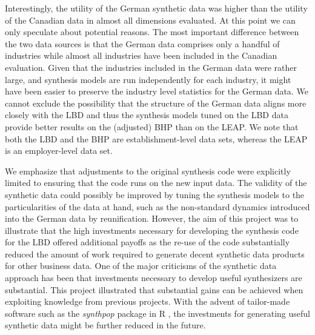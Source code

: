 \documentclass[10pt,twoside]{article}
\begin{document}
Interestingly, the utility of the German synthetic data was higher than the utility of the Canadian data in almost all dimensions evaluated. At this point we can only speculate about potential reasons. The most important difference between the two data sources is that the German data comprises only a handful of industries while almost all industries have been included in the Canadian evaluation. Given that the industries included in the German data were rather large, and synthesis models are run independently for each industry, it might have been easier to preserve the industry level statistics for the German data. We cannot exclude the possibility that  the structure of the German data aligns more closely with the LBD and thus the synthesis models tuned on the LBD data provide better results on the (adjusted) BHP than on the LEAP. We note that both the LBD and the BHP are establishment-level data sets, whereas the LEAP is an employer-level data set. 

We emphasize that adjustments to the original synthesis code were explicitly limited to ensuring that the code runs on the new input data. The validity of the synthetic data could possibly be improved by tuning the synthesis models to the particularities of the data at hand, such as the non-standard dynamics introduced into the German data by reunification.  However, the aim of this project was to illustrate that the high investments necessary for developing the synthesis code for the LBD offered additional payoffs as the re-use of the code substantially reduced the amount of work required to generate decent synthetic data products for other business data. One of the major criticisms of the synthetic data approach has been  that investments necessary to develop useful synthesizers are substantial. This project illustrated that substantial gains can be achieved when exploiting knowledge from previous projects. With the advent of tailor-made software such as the \textit{synthpop} package in R \citep{JSSv074i11}, the investments for generating useful synthetic data might be further reduced in the future.
\end{document}
